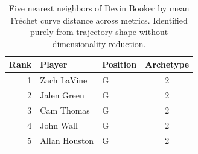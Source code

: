 \begin{table}[htbp]
  \centering\small
  \begin{tabular}{rllc}
    \toprule
    Rank & Player & Position & Archetype \\
    \midrule
    1 & Zach LaVine & G & 2 \\
    2 & Jalen Green & G & 2 \\
    3 & Cam Thomas & G & 2 \\
    4 & John Wall & G & 2 \\
    5 & Allan Houston & G & 2 \\
    \bottomrule
  \end{tabular}
  \caption{Five nearest neighbors of Devin Booker by mean Fr\'{e}chet curve distance across metrics. Identified purely from trajectory shape without dimensionality reduction.}
  \label{tab:Devin_Booker_frechet_curve_neighbors}
\end{table}

